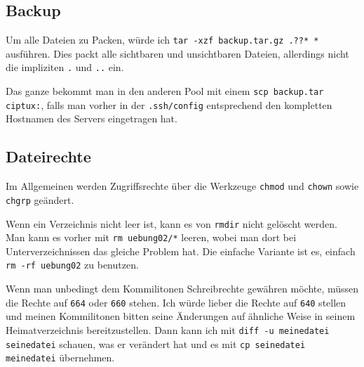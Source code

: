 \subsection{Backup}

Um alle Dateien zu Packen, würde ich \verb#tar -xzf backup.tar.gz .??* *# ausführen. Dies packt alle sichtbaren und unsichtbaren Dateien, allerdings nicht die impliziten \texttt{.} und \texttt{..} ein.

Das ganze bekommt man in den anderen Pool mit einem \verb#scp backup.tar ciptux:#, falls man vorher in der \texttt{.ssh/config} entsprechend den kompletten Hostnamen des Servers eingetragen hat.

\subsection{Dateirechte}

Im Allgemeinen werden Zugriffsrechte über die Werkzeuge \texttt{chmod} und \texttt{chown} sowie \texttt{chgrp} geändert.

Wenn ein Verzeichnis nicht leer ist, kann es von \texttt{rmdir} nicht gelöscht werden. Man kann es vorher mit \texttt{rm uebung02/*} leeren, wobei man dort bei Unterverzeichnissen das gleiche Problem hat. Die einfache Variante ist es, einfach \texttt{rm -rf uebung02} zu benutzen.

Wenn man unbedingt dem Kommilitonen Schreibrechte gewähren möchte, müssen die Rechte auf \texttt{664} oder \texttt{660} stehen. Ich würde lieber die Rechte auf \texttt{640} stellen und meinen Kommilitonen bitten seine Änderungen auf ähnliche Weise in seinem Heimatverzeichnis bereitzustellen. Dann kann ich mit \texttt{diff -u meinedatei seinedatei} schauen, was er verändert hat und es mit \texttt{cp seinedatei meinedatei} übernehmen.
